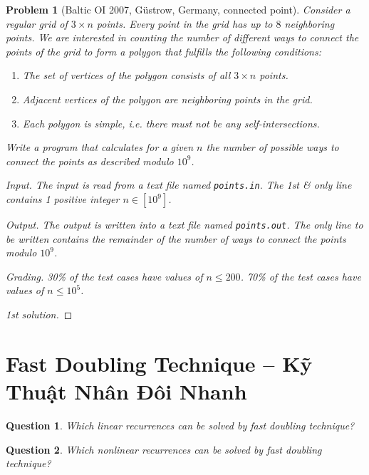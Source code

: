 \documentclass{article}
\newtheorem{problem}{Problem}
\newtheorem{question}{Question}
\begin{document}
\begin{problem}[Baltic OI 2007, G\"ustrow, Germany, connected point]
    Consider a regular grid of $3\times n$ points. Every point in the grid has up to $8$ neighboring points. We are interested in counting the number of different ways to connect the points of the grid to form a polygon that fulfills the following conditions:
    \begin{enumerate}
        \item The set of vertices of the polygon consists of all $3\times n$ points.
        \item Adjacent vertices of the polygon are neighboring points in the grid.
        \item Each polygon is simple, i.e. there must not be any self-intersections.
    \end{enumerate}
    Write a program that calculates for a given $n$ the number of possible ways to connect the points as described modulo $10^9$.
    \item {\sf Input.} The input is read from a text file named {\tt points.in}. The 1st \& only line contains 1 positive integer $n\in[10^9]$.
    \item {\sf Output.} The output is written into a text file named {\tt points.out}. The only line to be written contains the remainder of the number of ways to connect the points modulo $10^9$.
    \item {\sf Grading.} 30\% of the test cases have values of $n\le200$. 70\% of the test cases have values of $n\le10^5$.
\end{problem}

\begin{proof}[1st solution]

\end{proof}


\section{Fast Doubling Technique -- Kỹ Thuật Nhân Đôi Nhanh}

\begin{question}
    Which linear recurrences can be solved by fast doubling technique?
\end{question}

\begin{question}
    Which nonlinear recurrences can be solved by fast doubling technique?
\end{question}
\end{document}

